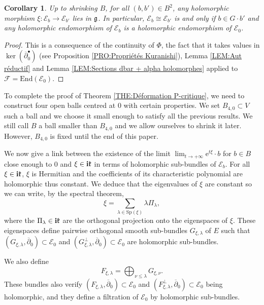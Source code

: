 \documentclass{article}
\newtheorem{corollary}[theorem]{Corollary}
\theoremstyle{remark}
\theoremstyle{definition}
\newcommand{\End}{\mathrm{End}}
\renewcommand{\i}{\boldsymbol{\mathrm{i}}}
\newcommand{\e}{\boldsymbol{\mathrm{e}}}
\newcommand{\E}{\mathcal{E}}
\newcommand{\F}{\mathcal{F}}
\newcommand{\dbar}{\overline{\partial}}
\renewcommand{\leq}{\leqslant}
\begin{document}
\begin{corollary}\label{COR:Sections dbar_b holomorphes}
    Up to shrinking $B$, for all $(b,b') \in B^2$, any holomorphic morphism $\xi : \E_b \rightarrow \E_{b'}$ lies in $\frak{g}$. In particular, $\E_b \cong \E_{b'}$ is and only if $b \in G \cdot b'$ and any holomorphic endomorphism of $\E_b$ is a holomorphic endomorphism of $\E_0$.
\end{corollary}
\begin{proof}
This is a consequence of the continuity of $\Phi$, the fact that it takes values in $\ker(\dbar_0^\bullet)$ (see Proposition \ref{PRO:Propriétés Kuranishi}), Lemma \ref{LEM:Aut réductif} and Lemma \ref{LEM:Sections dbar + alpha holomorphes} applied to $\F = \End(\E_0)$.
\end{proof}

To complete the proof of Theorem \ref{THE:Déformation P-critique}, we need to construct four open balls centred at $0$ with certain properties. We set $B_{4,0} \subset V$ such a ball and we choose it small enough to satisfy all the previous results. We still call $B$ a ball smaller than $B_{4,0}$ and we allow ourselves to shrink it later. However, $B_{4,0}$ is fixed until the end of this paper.

We now give a link between the existence of the limit $\lim_{t \rightarrow +\infty} \e^{t\xi} \cdot b$ for $b \in B$ close enough to $0$ and $\xi \in \i\frak{k}$ in terms of holomorphic sub-bundles of $\E_b$. For all $\xi \in \i\frak{k}$, $\xi$ is Hermitian and the coefficients of its characteristic polynomial are holomorphic thus constant. We deduce that the eigenvalues of $\xi$ are constant so we can write, by the spectral theorem,
$$
\xi = \sum_{\lambda \in \mathrm{Sp}(\xi)} \lambda\Pi_\lambda,
$$
where the $\Pi_\lambda \in \i\frak{k}$ are the orthogonal projection onto the eigenspaces of $\xi$. These eigenspaces define pairwise orthogonal smooth sub-bundles $G_{\xi,\lambda}$ of $E$ such that $(G_{\xi,\lambda},\dbar_0) \subset \E_0$ and $(G_{\xi,\lambda}^\bot,\dbar_0) \subset \E_0$ are holomorphic sub-bundles.

We also define
$$
F_{\xi,\lambda} = \bigoplus_{\nu \leq \lambda} G_{\xi,\nu}.
$$
These bundles also verify $(F_{\xi,\lambda},\dbar_0) \subset \E_0$ and $(F_{\xi,\lambda}^\bot,\dbar_0) \subset \E_0$ being holomorphic, and they define a filtration of $\E_0$ by holomorphic sub-bundles.
\end{document}

